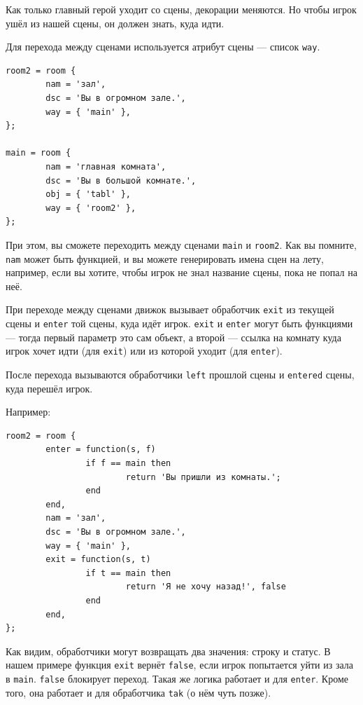 \documentclass[a4paper,12pt]{article}
\begin{document}
Как только главный герой уходит со сцены, декорации меняются. Но чтобы игрок ушёл из нашей сцены, он должен знать, куда идти.

Для перехода между сценами используется атрибут сцены --- список \verb/way/.

\begin{verbatim}
room2 = room {
        nam = 'зал',
        dsc = 'Вы в огромном зале.',
        way = { 'main' },
};

main = room {
        nam = 'главная комната',
        dsc = 'Вы в большой комнате.',
        obj = { 'tabl' },
        way = { 'room2' },
};
\end{verbatim}

При этом, вы сможете переходить между сценами \verb/main/ и \verb/room2/. Как вы помните, \verb/nam/ может быть функцией, и вы можете генерировать имена сцен на лету, например, если вы хотите, чтобы игрок не знал название сцены, пока не попал на неё.

При переходе между сценами движок вызывает обработчик \verb/exit/ из текущей сцены и \verb/enter/ той сцены, куда идёт игрок. \verb/exit/ и \verb/enter/ могут быть функциями --- тогда первый параметр это сам объект, а второй --- ссылка на комнату куда игрок хочет идти (для \verb/exit/) или из которой уходит (для \verb/enter/).

После перехода вызываются обработчики \verb/left/ прошлой сцены и \verb/entered/ сцены, куда перешёл игрок.

Например:

\begin{verbatim}
room2 = room {
        enter = function(s, f)
                if f == main then
                        return 'Вы пришли из комнаты.';
                end
        end,
        nam = 'зал',
        dsc = 'Вы в огромном зале.',
        way = { 'main' },
        exit = function(s, t)
                if t == main then
                        return 'Я не хочу назад!', false
                end
        end,
};
\end{verbatim}

Как видим, обработчики могут возвращать два значения: строку и статус. В нашем примере функция \verb/exit/ вернёт \verb/false/, если игрок попытается уйти из зала в \verb/main/. \verb/false/ блокирует переход. Такая же логика работает и для \verb/enter/. Кроме того, она работает и для обработчика \verb/tak/ (о нём чуть позже).
\end{document}
